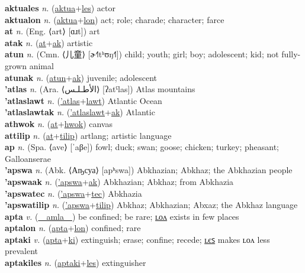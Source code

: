 \textbf{aktuales} \textit{n.} (\hyperref[aktua]{aktua}+\hyperref[les]{les})
actor \label{aktuales} \\
\textbf{aktualon} \textit{n.} (\hyperref[aktua]{aktua}+\hyperref[lon]{lon})
act; role; charade; character; farce \label{aktualon} \\
\textbf{at} \textit{n.} (Eng. ⟨art⟩ [ɑɹt])
art \label{at} \\
\textbf{atak} \textit{n.} (\hyperref[at]{at}+\hyperref[ak]{ak})
artistic \label{atak} \\
\textbf{atun} \textit{n.} (Cmn. ⟨儿童⟩ [ɚ˧˥tʰʊŋ˧˥])
child; youth; girl; boy; adolescent; kid; not fully-grown animal \label{atun} \\
\textbf{atunak} \textit{n.} (\hyperref[atun]{atun}+\hyperref[ak]{ak})
juvenile; adolescent \label{atunak} \\
\textbf{'atlas} \textit{n.} (Ara. ⟨الأطـلـس‎⟩ [ʔatˤlas])
Atlas mountains \label{'atlas} \\
\textbf{'atlaslawt} \textit{n.} (\hyperref['atlas]{'atlas}+\hyperref[lawt]{lawt})
Atlantic Ocean \label{'atlaslawt} \\
\textbf{'atlaslawtak} \textit{n.} (\hyperref['atlaslawt]{'atlaslawt}+\hyperref[ak]{ak})
Atlantic \label{'atlaslawtak} \\
\textbf{athwok} \textit{n.} (\hyperref[at]{at}+\hyperref[hwok]{hwok})
canvas \label{athwok} \\
\textbf{attilip} \textit{n.} (\hyperref[at]{at}+\hyperref[tilip]{tilip})
artlang; artistic language \label{attilip} \\
\textbf{ap} \textit{n.} (Spa. ⟨ave⟩ [ˈaβe])
fowl; duck; swan; goose; chicken; turkey; pheasant; Galloanserae \label{ap} \\
\textbf{'apswa} \textit{n.} (Abk. ⟨Аҧсуа⟩ [apʰswa])
Abkhazian; Abkhaz; the Abkhazian people \label{'apswa} \\
\textbf{'apswaak} \textit{n.} (\hyperref['apswa]{'apswa}+\hyperref[ak]{ak})
Abkhazian; Abkhaz; from Abkhazia \label{'apswaak} \\
\textbf{'apswatec} \textit{n.} (\hyperref['apswa]{'apswa}+\hyperref[tec]{tec})
Abkhazia \label{'apswatec} \\
\textbf{'apswatilip} \textit{n.} (\hyperref['apswa]{'apswa}+\hyperref[tilip]{tilip})
Abkhaz; Abkhazian; Abxaz; the Abkhaz language \label{'apswatilip} \\
\textbf{apta} \textit{v.} (\hyperref[amla]{~~amla~~})
be confined; be rare; \hyperref[aptalon]{ʟᴏᴧ} exists in few places \label{apta} \\
\textbf{aptalon} \textit{n.} (\hyperref[apta]{apta}+\hyperref[lon]{lon})
confined; rare \label{aptalon} \\
\textbf{aptaki} \textit{v.} (\hyperref[apta]{apta}+\hyperref[ki]{ki})
extinguish; erase; confine; recede; \hyperref[aptakiles]{ʟєꜱ} makes ʟᴏᴧ less prevalent \label{aptaki} \\
\textbf{aptakiles} \textit{n.} (\hyperref[aptaki]{aptaki}+\hyperref[les]{les})
extinguisher \label{aptakiles} \\

